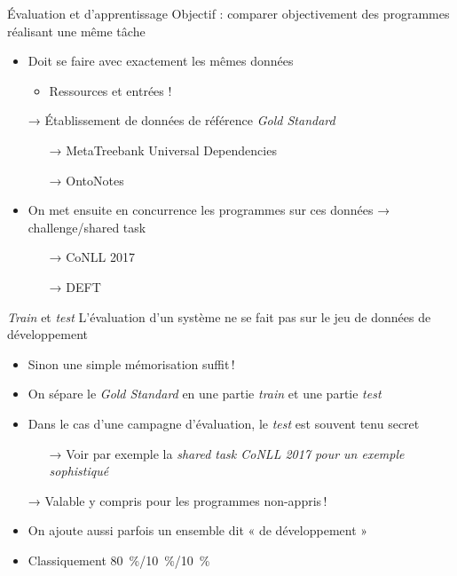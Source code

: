 \documentclass[hyperref={unicode}, xcolor={svgnames}, french]{beamer}
\begin{document}
\begin{frame}{Évaluation et d'apprentissage}
    Objectif : comparer \alert{objectivement} des programmes réalisant une même tâche
    \begin{itemize}
        \item Doit se faire avec exactement les mêmes données
            \begin{itemize}
                \item Ressources et entrées !
            \end{itemize}
        \item[→] Établissement de données de référence \alert{\textit{Gold Standard}}
            \begin{itemize}
                \item[→] MetaTreebank Universal Dependencies 
                \item[→] OntoNotes 
            \end{itemize}
        \item On met ensuite en concurrence les programmes sur ces données → challenge/shared task
            \begin{itemize}
                \item[→] CoNLL 2017 
                \item[→] \alert{DEFT} 
            \end{itemize}
    \end{itemize}
\end{frame}

\begin{frame}{\textit{Train} et \textit{test}}
    L'évaluation d'un système ne se fait pas sur le jeu de données de développement
    \begin{itemize}
        \item Sinon une simple mémorisation suffit !
        \item On sépare le \textit{Gold Standard} en une partie \alert{\textit{train}} et une partie \alert{\textit{test}}
        \item Dans le cas d'une campagne d'évaluation, le \textit{test} est souvent tenu secret
            \begin{itemize}
                \item[→] Voir par exemple la \textit{shared task CoNLL 2017 pour un exemple sophistiqué}
            \end{itemize}
        \item[→] Valable y compris pour les programmes non-appris !
        \item On ajoute aussi parfois un ensemble dit « de développement »
        \item Classiquement \SI{80}{\percent}/\SI{10}{\percent}/\SI{10}{\percent}
    \end{itemize}
\end{frame}
\end{document}
